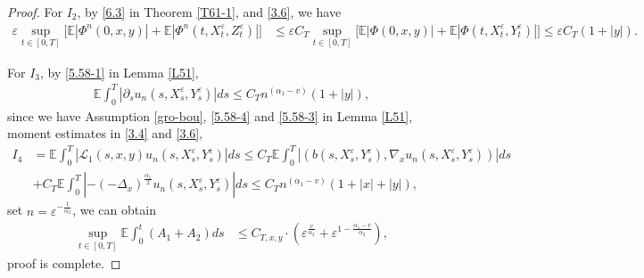 \documentclass[10pt,a4paper]{amsart}
\begin{document}
\begin{proof}
For $I_{2}$, by \eqref{6.3} in Theorem \ref{T61-1}, and \eqref{3.6}, we have 
\begin{align*}
	\varepsilon\sup_{t\in [0,T]}\big[  \mathbb{E}|\Phi^{n}(0,x,y)|+\mathbb{E}|\Phi^{n}(t,X_{t}^{\varepsilon},Z_{t}^{\varepsilon})|\big]  &\leq \varepsilon C_{T}\sup_{t\in [0,T]}\big[  \mathbb{E}|\Phi(0,x,y)|+\mathbb{E}|\Phi(t,X_{t}^{\varepsilon},Y_{t}^{\varepsilon})|\big] \leq \varepsilon C_{T}(1+|y|).
\end{align*}


For $ I_3$, by \eqref{5.58-1} in Lemma \ref{L51},
\begin{align*}
\mathbb{E}\int_{0}^{T}\left|\partial_{s}u_{n}(s,X_{s}^{\varepsilon},Y_{s}^{\varepsilon})\right|ds\leq C_{T}n^{(\alpha_{1}-v)}(1+|y|),
\end{align*}
since we have Assumption \ref{gro-bou}, \eqref{5.58-4} and \eqref{5.58-3} in Lemma \ref{L51}, moment estimates in \eqref{3.4} and \eqref{3.6},
\begin{align*}
I_{4}&=\mathbb{E}\int_{0}^{T}|\mathcal{L}_{1}(s,x,y)u_{n}(s,X_{s}^{\varepsilon},Y_{s}^{\varepsilon})|ds\leq C_{T}  \mathbb{E} \int_{0}^{T}|(b(s,X_{s}^{\varepsilon},Y_{s}^{\varepsilon}),\nabla_{x}u_{n}(s,X_{s}^{\varepsilon},Y_{s}^{\varepsilon}))|ds	\\
&+ C_{T} \mathbb{E}\int_{0}^{T}|-(-\Delta_{x})^{\frac{\alpha_{1}}{2}}u_{n}(s,X_{s}^{\varepsilon},Y_{s}^{\varepsilon})|ds\leq C_{T}n^{(\alpha_{1}-v)}(1+|x|+|y|),
\end{align*}
set $n=\varepsilon^{-\frac{1}{\alpha_{2}}}$, we can obtain
\begin{align*}
\sup_{t\in [0,T]}\mathbb{E}\int_{0}^{t}\left(A_{1}+A_{2}\right)ds&\leq C_{T,x,y}\cdot \left(\varepsilon^{\frac{v}{\alpha_{2}}}+\varepsilon^{1-\frac{\alpha_{1}-v}{\alpha_{2}}}\right),
\end{align*}
proof is complete.
\end{proof}
\end{document}

